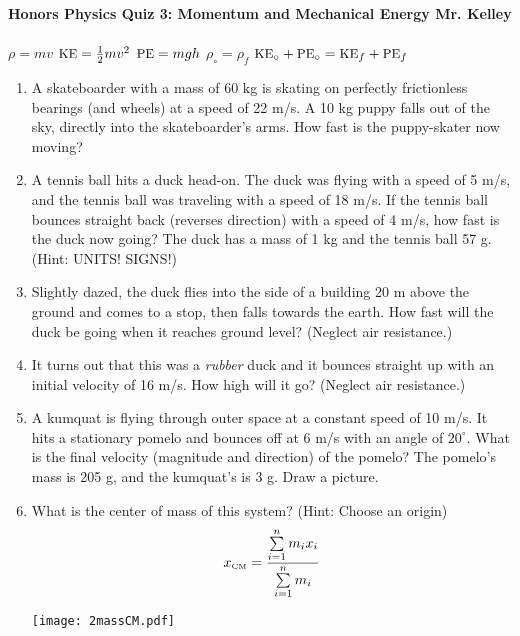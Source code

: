 \documentclass[12pt]{report}
\newcommand{\ke}{\mbox{\small KE}}
\newcommand{\pe}{\mbox{\small PE}}
\begin{document}
{\bf{Honors Physics} \hfill {Quiz 3: Momentum and Mechanical Energy} \hfill {Mr. Kelley}} \\ \\
$\rho=mv$ \hfill $\ke=\frac{1}{2}mv^2$ \hfill $\pe=mgh$ \hfill $\rho_\circ = \rho_f$ \hfill $\ke_\circ + \pe_\circ = \ke_f + \pe_f$


\begin{enumerate}
\item A skateboarder with a mass of 60 kg is skating on perfectly frictionless bearings (and wheels) at a speed of 22 m/s.  A 10 kg puppy falls out of the sky, directly into the skateboarder's arms.  How fast is the puppy-skater now moving?
\vfill
\item A tennis ball hits a duck head-on.  The duck was flying with a speed of 5 m/s, and the tennis ball was traveling with a speed of 18 m/s.  If the tennis ball bounces straight back (reverses direction) with a speed of 4 m/s, how fast is the duck now going?  The duck has a mass of 1 kg and the tennis ball 57 g.  (Hint: UNITS! SIGNS!)
\vfill
\pagebreak
\item Slightly dazed, the duck flies into the side of a building 20 m above the ground and comes to a stop, then falls towards the earth.  How fast will the duck be going when it reaches ground level?  (Neglect air resistance.)
\vfill
\item It turns out that this was a \emph{rubber} duck and it bounces straight up with an initial velocity of 16 m/s.  How high will it go?  (Neglect air resistance.)
\vfill
\pagebreak
\item A kumquat is flying through outer space at a constant speed of 10 m/s.  It hits a stationary pomelo and bounces off at 6 m/s with an angle of $20^\circ$.  What is the final velocity (magnitude and direction) of the pomelo?  The pomelo's mass is 205 g, and the kumquat's is 3 g.  Draw a picture.
\vfill
\pagebreak
\item What is the center of mass of this system?  (Hint: Choose an origin) 
$$ x_{\mbox{\tiny CM}} = \frac{\sum\limits_{i=1}^{n} m_i x_i}{\sum\limits_{i=1}^{n} m_i}$$
\begin{center}
\texttt{[image: 2massCM.pdf]}
\end{center}
\vfill
\end{enumerate}
\end{document}
